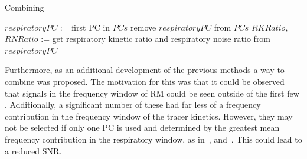                     \begin{algorithm}
                        \caption{Combining }
                        \;
                        $respiratoryPC$ := first \gls{PC} in $PCs$\;
                        remove $respiratoryPC$ from $PCs$\;
                        $RKRatio$, $RNRatio$ := get respiratory kinetic ratio and respiratory noise ratio from $respiratoryPC$\;
                        \;
                    \end{algorithm} \label{eq:pca_data_driven_surrogate_signal_extraction_methods_for_dynamic_pet_methods_combining_pcs_pseudo_code}
                    
                    Furthermore, as an additional development of the previous methods a way to combine  was proposed. The motivation for this was that it could be observed that signals in the frequency window of \gls{RM} could be seen outside of the first few . Additionally, a significant number of these had far less of a frequency contribution in the frequency window of the tracer kinetics. However, they may not be selected if only one \gls{PC} is used and determined by the greatest mean frequency contribution in the respiratory window, as in~, and~. This could lead to a reduced \gls{SNR}.
                    
